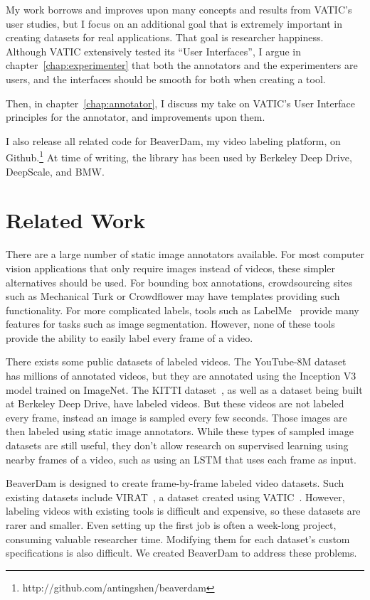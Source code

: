 My work borrows and improves upon many concepts and results from VATIC's user studies, but I focus on an additional goal that is extremely important in creating datasets for real applications. That goal is researcher happiness.
Although VATIC extensively tested its ``User Interfaces'', I argue in chapter~\ref{chap:experimenter} that both the annotators and the experimenters are users, and the interfaces should be smooth for both when creating a tool.

Then, in chapter~\ref{chap:annotator}, I discuss my take on VATIC's User Interface principles for the annotator, and improvements upon them.

I also release all related code for BeaverDam, my video labeling platform, on Github.\footnote{http://github.com/antingshen/beaverdam} At time of writing, the library has been used by Berkeley Deep Drive, DeepScale, and BMW.

\section*{Related Work}
\label{sec:related}

There are a large number of static image annotators available.
For most computer vision applications that only require images instead of videos, these simpler alternatives should be used.
For bounding box annotations, crowdsourcing sites such as Mechanical Turk or Crowdflower may have templates providing such functionality.
For more complicated labels, tools such as LabelMe~\cite{LabelMe} provide many features for tasks such as image segmentation.
However, none of these tools provide the ability to easily label every frame of a video.

There exists some public datasets of labeled videos.
The YouTube-8M dataset~\cite{YouTube-8M} has millions of annotated videos, but they are annotated using the Inception V3 model trained on ImageNet.
The KITTI dataset~\cite{KITTI}, as well as a dataset being built at Berkeley Deep Drive, have labeled videos.
But these videos are not labeled every frame, instead an image is sampled every few seconds.
Those images are then labeled using static image annotators.
While these types of sampled image datasets are still useful, they don't allow research on supervised learning using nearby frames of a video, such as using an LSTM that uses each frame as input.

BeaverDam is designed to create frame-by-frame labeled video datasets.
Such existing datasets include VIRAT~\cite{virat}, a dataset created using VATIC~\cite{Vatic}.
However, labeling videos with existing tools is difficult and expensive, so these datasets are rarer and smaller.
Even setting up the first job is often a week-long project, consuming valuable researcher time.
Modifying them for each dataset's custom specifications is also difficult.
We created BeaverDam to address these problems.

